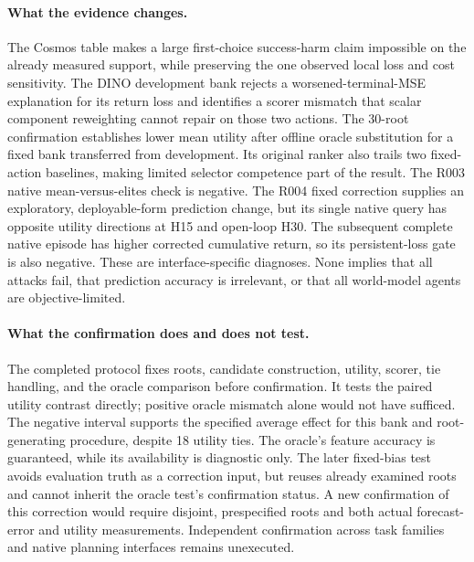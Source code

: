 \documentclass[11pt]{article}
\begin{document}
\paragraph{What the evidence changes.}
The Cosmos table makes a large first-choice success-harm claim impossible on
the already measured support, while preserving the one observed local loss
and cost sensitivity. The DINO development bank rejects a worsened-terminal-MSE
explanation for its return loss and identifies a scorer mismatch that scalar
component reweighting cannot repair on those two actions. The 30-root
confirmation establishes lower mean utility after offline oracle substitution
for a fixed bank transferred from development. Its original ranker also trails
two fixed-action baselines, making limited selector competence part of the
result. The R003 native mean-versus-elites check is negative. The R004 fixed
correction supplies an exploratory, deployable-form prediction change, but
its single native query has opposite utility directions at H15 and open-loop
H30. The subsequent complete native episode has higher corrected cumulative
return, so its persistent-loss gate is also negative.
These are interface-specific diagnoses. None implies
that all attacks fail, that prediction accuracy is irrelevant, or that all
world-model agents are objective-limited.

\paragraph{What the confirmation does and does not test.}
The completed protocol fixes roots, candidate construction, utility, scorer,
tie handling, and the oracle comparison before confirmation. It tests the
paired utility contrast directly; positive oracle mismatch alone would not
have sufficed. The negative interval supports the specified average effect
for this bank and root-generating procedure, despite 18 utility ties. The
oracle's feature accuracy is guaranteed, while its availability is diagnostic
only. The later fixed-bias test avoids evaluation truth as a correction input,
but reuses already examined roots and cannot inherit the oracle test's
confirmation status. A new confirmation of this correction would require
disjoint, prespecified roots and both actual forecast-error and utility
measurements. Independent confirmation across task families and native planning
interfaces remains unexecuted.
\end{document}
